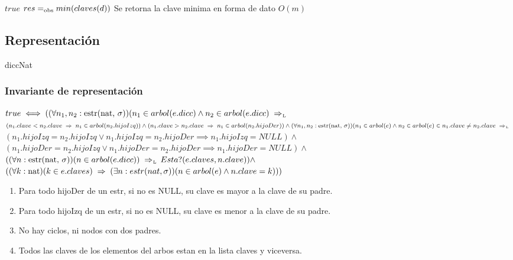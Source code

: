  {$true$}
 {$res =_{\mathrm{obs}} min(claves(d))$}
 {Se retorna la clave minima en forma de dato}
 {$O(m)$}
 {}

\subsection{Representación}

diccNat

\subsubsection*{Invariante de representación}

$true \iff ((\paratodo{estr(nat, \sigma)}{n_1, n_2})(n_1 \in arbol(e.dicc) \land n_2 \in arbol(e.dicc) \impluego $\\$
(n_1.clave < n_2.clave \implies n_1 \in arbol(n_2.hijoIzq)) \land (n_1.clave > n_2.clave \implies n_1 \in arbol(n_2.hijoDer)) \land (\paratodo{estr(nat, \sigma)}{n_1, n_2})(n_1 \in arbol(e) \land n_2 \in arbol(e) \in n_1.clave \neq n_2.clave \impluego $\\$ (n_1.hijoIzq = n_2.hijoIzq \lor n_1.hijoIzq = n_2.hijoDer \implies n_1.hijoIzq = NULL) \land $\\$
(n_1.hijoDer = n_2.hijoIzq \lor n_1.hijoDer = n_2.hijoDer \implies n_1.hijoDer = NULL) \land $\\$ 
((\paratodo{estr(nat, \sigma)}{n})(n \in arbol(e.dicc)) \impluego  Esta?(e.claves, n.clave)) \land $\\$
((\paratodo{nat}{k})(k \in e.claves) \implies (\exists n: estr(nat, \sigma))(n \in arbol(e) \land n.clave = k)))$
\begin{enumerate}
\item Para todo hijoDer de un estr, si no es NULL, su clave es mayor a la clave de su padre.
\item Para todo hijoIzq de un estr, si no es NULL, su clave es menor a la clave de su padre.
\item No hay ciclos, ni nodos con dos padres.
\item Todos las claves de los elementos del arbos estan en la lista claves y viceversa.
\end{enumerate}

